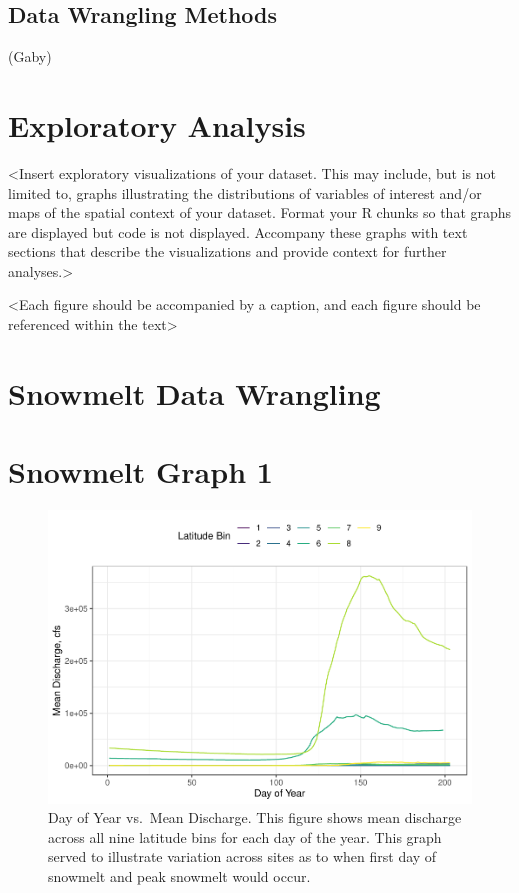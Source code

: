 \documentclass[12pt,]{article}
\begin{document}
\hypertarget{data-wrangling-methods}{%
\subsection{Data Wrangling Methods}\label{data-wrangling-methods}}

(Gaby)

\hypertarget{exploratory-analysis}{%
\section{Exploratory Analysis}\label{exploratory-analysis}}

\textless{}Insert exploratory visualizations of your dataset. This may
include, but is not limited to, graphs illustrating the distributions of
variables of interest and/or maps of the spatial context of your
dataset. Format your R chunks so that graphs are displayed but code is
not displayed. Accompany these graphs with text sections that describe
the visualizations and provide context for further
analyses.\textgreater{}

\textless{}Each figure should be accompanied by a caption, and each
figure should be referenced within the text\textgreater{}

\hypertarget{snowmelt-data-wrangling}{%
\section{Snowmelt Data Wrangling}\label{snowmelt-data-wrangling}}

\hypertarget{snowmelt-graph-1}{%
\section{Snowmelt Graph 1}\label{snowmelt-graph-1}}

\begin{figure}
\centering
\includegraphics{Project_Report_v2_files/figure-latex/Snowmelt Day of Year Exploratory Graph 1-1.pdf}
\caption{Day of Year vs.~Mean Discharge. This figure shows mean
discharge across all nine latitude bins for each day of the year. This
graph served to illustrate variation across sites as to when first day
of snowmelt and peak snowmelt would occur.}
\end{figure}
\end{document}
